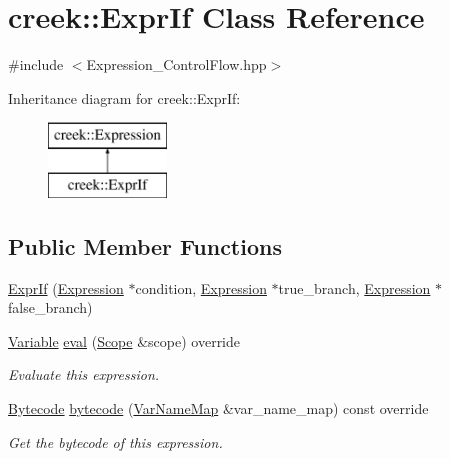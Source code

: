 \hypertarget{classcreek_1_1_expr_if}{}\section{creek\+:\+:Expr\+If Class Reference}
\label{classcreek_1_1_expr_if}


{\ttfamily \#include $<$Expression\+\_\+\+Control\+Flow.\+hpp$>$}

Inheritance diagram for creek\+:\+:Expr\+If\+:\begin{figure}[H]
\begin{center}
\leavevmode
\includegraphics[height=2.000000cm]{classcreek_1_1_expr_if}
\end{center}
\end{figure}
\subsection*{Public Member Functions}
\begin{DoxyCompactItemize}
\item 
\hyperlink{classcreek_1_1_expr_if_a8591b6662cc0071a9a1c7fbd4a96354e}{Expr\+If} (\hyperlink{classcreek_1_1_expression}{Expression} $\ast$condition, \hyperlink{classcreek_1_1_expression}{Expression} $\ast$true\+\_\+branch, \hyperlink{classcreek_1_1_expression}{Expression} $\ast$false\+\_\+branch)
\item 
\hyperlink{classcreek_1_1_variable}{Variable} \hyperlink{classcreek_1_1_expr_if_a0aceaefe760432ec4404fd4bb2b95076}{eval} (\hyperlink{classcreek_1_1_scope}{Scope} \&scope) override
\begin{DoxyCompactList}\small\item\em Evaluate this expression. \end{DoxyCompactList}\item 
\hyperlink{classcreek_1_1_bytecode}{Bytecode} \hyperlink{classcreek_1_1_expr_if_ab74b29a8da0394d49d8d20a5820364c6}{bytecode} (\hyperlink{classcreek_1_1_var_name_map}{Var\+Name\+Map} \&var\+\_\+name\+\_\+map) const  override\hypertarget{classcreek_1_1_expr_if_ab74b29a8da0394d49d8d20a5820364c6}{}\label{classcreek_1_1_expr_if_ab74b29a8da0394d49d8d20a5820364c6}

\begin{DoxyCompactList}\small\item\em Get the bytecode of this expression. \end{DoxyCompactList}\end{DoxyCompactItemize}


